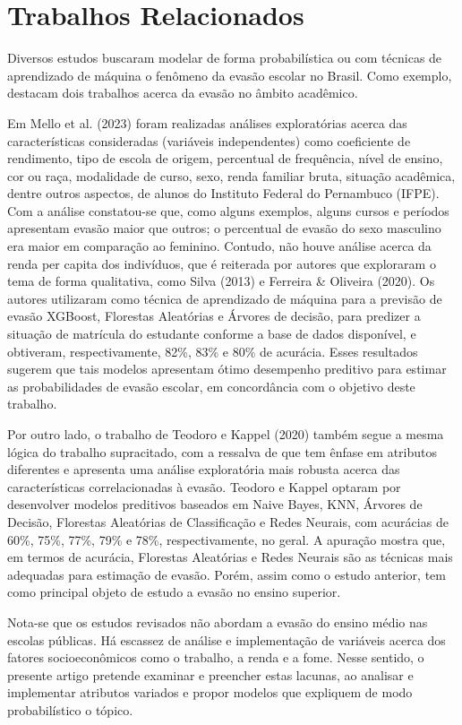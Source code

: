 \documentclass[english, spanish, brazilian]{RBIEarticle} %
\begin{document}
\section{Trabalhos Relacionados}
Diversos estudos buscaram modelar de forma probabilística ou com técnicas de aprendizado de máquina o fenômeno da evasão escolar no Brasil. Como exemplo, destacam dois trabalhos acerca da evasão no âmbito acadêmico.

Em Mello et al. (2023) foram realizadas análises exploratórias acerca das características consideradas (variáveis independentes) como coeficiente de rendimento, tipo de escola de origem, percentual de frequência, nível de ensino, cor ou raça, modalidade de curso, sexo, renda familiar bruta, situação acadêmica, dentre outros aspectos, de alunos do Instituto Federal do Pernambuco (IFPE). Com a análise constatou-se que, como alguns exemplos, alguns cursos e períodos apresentam evasão maior que outros; o percentual de evasão do sexo masculino era maior em comparação ao feminino. Contudo, não houve análise acerca da renda per capita dos indivíduos, que é reiterada por autores que exploraram o tema de forma qualitativa, como Silva (2013) e Ferreira \& Oliveira (2020). Os autores utilizaram como técnica de aprendizado de máquina para a previsão de evasão XGBoost, Florestas Aleatórias e Árvores de decisão, para predizer a situação de matrícula do estudante conforme a base de dados disponível, e obtiveram, respectivamente, 82\%, 83\% e 80\% de acurácia. Esses resultados sugerem que tais modelos apresentam ótimo desempenho preditivo para estimar as probabilidades de evasão escolar, em concordância com o objetivo deste trabalho.

Por outro lado, o trabalho de Teodoro e Kappel (2020) também segue a mesma lógica do trabalho supracitado, com a ressalva de que tem ênfase em atributos diferentes e apresenta uma análise exploratória mais robusta acerca das características correlacionadas à evasão. Teodoro e Kappel optaram por desenvolver modelos preditivos baseados em Naive Bayes, KNN, Árvores de Decisão, Florestas Aleatórias de Classificação e Redes Neurais, com acurácias de 60\%, 75\%, 77\%, 79\% e 78\%, respectivamente, no geral. A apuração mostra que, em termos de acurácia, Florestas Aleatórias e Redes Neurais são as técnicas mais adequadas para estimação de evasão. Porém, assim como o estudo anterior, tem como principal objeto de estudo a evasão no ensino superior.  

Nota-se que os estudos revisados não abordam a evasão do ensino médio nas escolas públicas. Há escassez de análise e implementação de variáveis acerca dos fatores socioeconômicos como o trabalho, a renda e a fome. Nesse sentido, o presente artigo pretende examinar e preencher estas lacunas, ao analisar e implementar atributos variados e propor modelos que expliquem de modo probabilístico o tópico.
\end{document}
